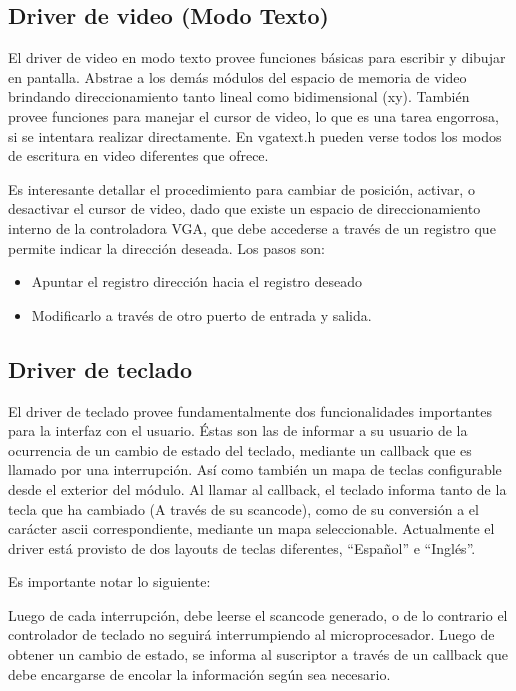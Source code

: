 \documentclass[11pt]{article}
\begin{document}
\subsection{Driver de video (Modo Texto)}

El driver de video en modo texto provee funciones básicas para escribir y dibujar en pantalla. Abstrae a los demás módulos del espacio de memoria de video brindando direccionamiento tanto lineal como bidimensional (xy). También provee funciones para manejar el cursor de video, lo que es una tarea engorrosa, si se intentara realizar directamente. En vgatext.h pueden verse todos los modos de escritura en video diferentes que ofrece.

Es interesante detallar el procedimiento para cambiar de posición, activar, o desactivar el cursor de video, dado que existe un espacio de direccionamiento interno de la controladora VGA, que debe accederse a través de un registro que permite indicar la dirección deseada. Los pasos son:

\begin{itemize}
    \item Apuntar el registro dirección hacia el registro deseado
    \item Modificarlo a través de otro puerto de entrada y salida.
\end{itemize}

\subsection{Driver de teclado}

El driver de teclado provee fundamentalmente dos funcionalidades importantes para la interfaz con el usuario. Éstas son las de informar a su usuario de la ocurrencia de un cambio de estado del teclado, mediante un callback que es llamado por una interrupción. Así como también un mapa de teclas configurable desde el exterior del módulo. 
Al llamar al callback, el teclado informa tanto de la tecla que ha cambiado (A través de su scancode), como de su conversión a el carácter ascii correspondiente, mediante un mapa seleccionable.
Actualmente el driver está provisto de dos layouts de teclas diferentes, “Español” e “Inglés”.

Es importante notar lo siguiente:

Luego de cada interrupción, debe leerse el scancode generado, o de lo contrario el controlador de teclado no seguirá interrumpiendo al microprocesador.
Luego de obtener un cambio de estado, se informa al suscriptor a través de un callback que debe encargarse de encolar la información según sea necesario. 
\end{document}

